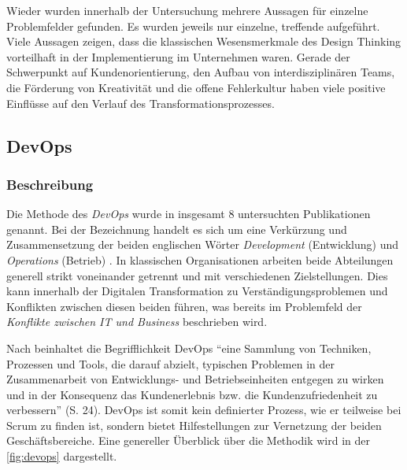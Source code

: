 Wieder wurden innerhalb der Untersuchung mehrere Aussagen für einzelne Problemfelder gefunden. Es wurden jeweils nur einzelne, treffende aufgeführt. Viele Aussagen zeigen, dass die klassischen Wesensmerkmale des Design Thinking vorteilhaft in der Implementierung im Unternehmen waren. Gerade der Schwerpunkt auf Kundenorientierung, den Aufbau von interdisziplinären Teams, die Förderung von Kreativität und die offene Fehlerkultur haben viele positive Einflüsse auf den Verlauf des Transformationsprozesses.
 
\subsection{DevOps}

\subsubsection{Beschreibung}

Die Methode des \textit{DevOps} wurde in insgesamt 8 untersuchten Publikationen genannt. Bei der Bezeichnung handelt es sich um eine Verkürzung und Zusammensetzung der beiden englischen Wörter \textit{Development} (Entwicklung) und \textit{Operations} (Betrieb) \cite[S. 23]{alt_innovationsorientiertes_2017}. In klassischen Organisationen arbeiten beide Abteilungen generell strikt voneinander getrennt und mit verschiedenen Zielstellungen. Dies kann innerhalb der Digitalen Transformation zu Verständigungsproblemen und Konflikten zwischen diesen beiden führen, was bereits im Problemfeld der \textit{Konflikte zwischen IT und Business} beschrieben wird.

Nach  beinhaltet die Begrifflichkeit DevOps ``eine Sammlung von Techniken, Prozessen und Tools, die darauf abzielt, typischen Problemen in der Zusammenarbeit von Entwicklungs- und Betriebseinheiten entgegen zu wirken und in der Konsequenz das Kundenerlebnis bzw. die Kundenzufriedenheit zu verbessern'' (S. 24). DevOps ist somit kein definierter Prozess, wie er teilweise bei Scrum zu finden ist, sondern bietet Hilfestellungen zur Vernetzung der beiden Geschäftsbereiche. Eine genereller Überblick über die Methodik wird in der \ref{fig:devops} dargestellt.

